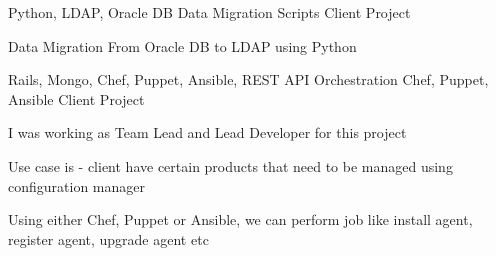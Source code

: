 

\begin{cventries}


  \cventry
    {Python, LDAP, Oracle DB} %
    {Data Migration Scripts} %
    {Client Project} %
    {} %
    {
      \begin{cvitems} %
        \item {Data Migration From Oracle DB to LDAP using Python}
      \end{cvitems}
    }

  \cventry
    {Rails, Mongo, Chef, Puppet, Ansible, REST API} %
    {Orchestration Chef, Puppet, Ansible} %
    {Client Project} %
    {} %
    {
      \begin{cvitems} %
        \item {I was working as Team Lead and Lead Developer for this project}
        \item {Use case is - client have certain products that need to be managed using configuration manager}
        \item {Using either Chef, Puppet or Ansible, we can perform job like install agent, register agent, upgrade agent etc}
      \end{cvitems}
    }


\end{cventries}
